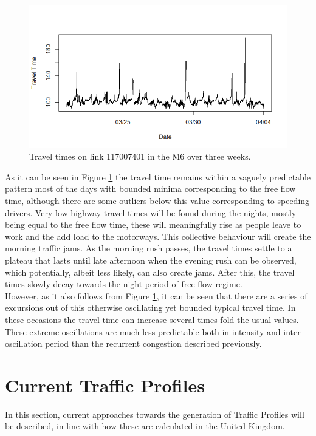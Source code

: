 \documentclass[conference]{IEEEtran}
\begin{document}
\begin{figure}[htbp]
	\centerline{\includegraphics[width=\linewidth]{./images/Traveltime_example.png}}
	\caption{Travel times on link 117007401 in the M6 over three weeks.}
	\label{fig:travel_time_example}
\end{figure}

As it can be seen in Figure \ref{fig:travel_time_example} the travel time remains within a vaguely predictable pattern most of the days with bounded minima corresponding to the free flow time, although there are some outliers below this value corresponding to speeding drivers. 
Very low highway travel times will be found during the nights, mostly being equal to the free flow time, these will meaningfully rise as people leave to work and the add load to the motorways. 
This collective behaviour will create the morning traffic jams. 
As the morning rush passes, the travel times settle to a plateau that lasts until late afternoon when the evening rush can be observed, which potentially, albeit less likely, can also create jams. 
After this, the travel times slowly decay towards the night period of free-flow regime.\\

However, as it also follows from Figure \ref{fig:travel_time_example}, it can be seen that there are a series of excursions out of this otherwise oscillating yet bounded typical travel time. 
In these occasions the travel time can increase several times fold the usual values. These extreme oscillations are much less predictable both in intensity and inter-oscillation period than the recurrent congestion described previously.
 
\section{Current Traffic Profiles}
In this section, current approaches towards the generation of Traffic Profiles will be described, in line with how these are calculated in the United Kingdom.
\end{document}
